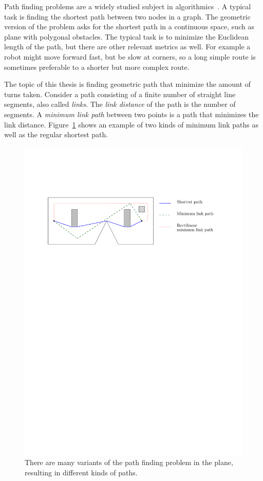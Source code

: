 \documentclass[english,gradu]{tktltiki2018}
\begin{document}
Path finding problems are a widely studied subject in algorithmics~\cite{survey}.
A typical task is finding the shortest path between two nodes in a graph.
The geometric version of the problem asks for the shortest path in a continuous space, such as plane with polygonal obstacles.
The typical task is to minimize the Euclidean length of the path, but there are other relevant metrics as well.
For example a robot might move forward fast, but be slow at corners, so a long simple route is sometimes preferable to a shorter but more complex route.

The topic of this thesis is finding geometric path that minimize the amount of turns taken.
Consider a path consisting of a finite number of straight line segments, also called \emph{links}.
The \emph{link distance} of the path is the number of segments.
A \emph{minimum link path} between two points is a path that minimizes the link distance.
Figure~\ref{fig:paths} shows an example of two kinds of minimum link paths as well as the regular shortest path.

\begin{figure}\centering
	\includegraphics[width=\textwidth]{fig/paths}
	\caption{There are many variants of the path finding problem in the plane, resulting in different kinds of paths.}\label{fig:paths}
\end{figure}
\end{document}
